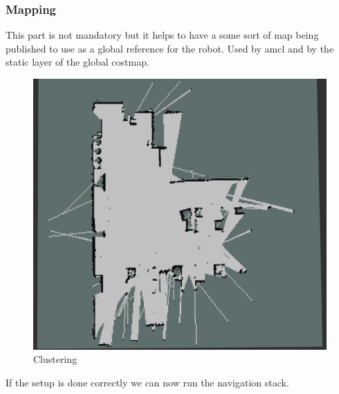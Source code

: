 \documentclass[12pt]{article}
\begin{document}
\subsubsection{Mapping}
This part is not mandatory but it helps to have a some sort of map being published to use as a global reference for the robot. Used by amcl and by the static layer of the global costmap.
\begin{figure}[!htb]
    \centering
    \includegraphics[scale=0.3]{map.png}
    \caption{Clustering}
    \label{fig:my_label}
\end{figure}


If the setup is done correctly we can now run the navigation stack.
\end{document}
